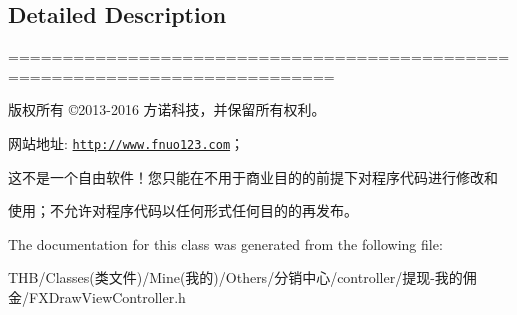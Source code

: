 \subsection{Detailed Description}
============================================================================

版权所有 ©2013-\/2016 方诺科技，并保留所有权利。

网站地址\+: \href{http://www.fnuo123.com}{\tt http\+://www.\+fnuo123.\+com}； 



这不是一个自由软件！您只能在不用于商业目的的前提下对程序代码进行修改和

使用；不允许对程序代码以任何形式任何目的的再发布。 

 

The documentation for this class was generated from the following file\+:\begin{DoxyCompactItemize}
\item 
T\+H\+B/\+Classes(类文件)/\+Mine(我的)/\+Others/分销中心/controller/提现-\/我的佣金/F\+X\+Draw\+View\+Controller.\+h\end{DoxyCompactItemize}

